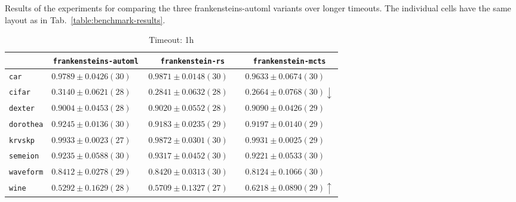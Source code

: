 \begin{table}[ht]
    \caption[Results of the experiments for comparing the three frankensteins-automl variants over longer timeouts.]{
        Results of the experiments for comparing the three frankensteins-automl variants over longer timeouts.
        The individual cells have the same layout as in Tab.~\ref{table:benchmark-results}.
    }
    \label{table:influence-results}
    \renewcommand{\arraystretch}{1.25}
    \begin{subtable}{\textwidth}
        \centering
        \caption{Timeout: 1h}
        \begin{tabular}{l|ccc}
            & \texttt{frankensteins-automl}  & \texttt{frankenstein-rs}  & \texttt{frankenstein-mcts} \\
            \hline
            \texttt{car} & $ 0.9789 \pm 0.0426 (30) \phantom{\downarrow}$ & $ \boldsymbol{0.9871} \pm 0.0148 (30) \phantom{\downarrow}$ & $ 0.9633 \pm 0.0674 (30) \phantom{\downarrow}$\\
            \texttt{cifar} & $ \boldsymbol{0.3140} \pm 0.0621 (28) \phantom{\downarrow}$ & $ 0.2841 \pm 0.0632 (28) \phantom{\downarrow}$ & $ 0.2664 \pm 0.0768 (30) \downarrow$\\
            \texttt{dexter} & $ 0.9004 \pm 0.0453 (28) \phantom{\downarrow}$ & $ 0.9020 \pm 0.0552 (28) \phantom{\downarrow}$ & $ \boldsymbol{0.9090} \pm 0.0426 (29) \phantom{\downarrow}$\\
            \texttt{dorothea} & $ \boldsymbol{0.9245} \pm 0.0136 (30) \phantom{\downarrow}$ & $ 0.9183 \pm 0.0235 (29) \phantom{\downarrow}$ & $ 0.9197 \pm 0.0140 (29) \phantom{\downarrow}$\\
            \texttt{krvskp} & $ \boldsymbol{0.9933} \pm 0.0023 (27) \phantom{\downarrow}$ & $ 0.9872 \pm 0.0301 (30) \phantom{\downarrow}$ & $ 0.9931 \pm 0.0025 (29) \phantom{\downarrow}$\\
            \texttt{semeion} & $ 0.9235 \pm 0.0588 (30) \phantom{\downarrow}$ & $ \boldsymbol{0.9317} \pm 0.0452 (30) \phantom{\downarrow}$ & $ 0.9221 \pm 0.0533 (30) \phantom{\downarrow}$\\
            \texttt{waveform} & $ 0.8412 \pm 0.0278 (29) \phantom{\downarrow}$ & $ \boldsymbol{0.8420} \pm 0.0313 (30) \phantom{\downarrow}$ & $ 0.8124 \pm 0.1066 (30) \phantom{\downarrow}$\\
            \texttt{wine} & $ 0.5292 \pm 0.1629 (28) \phantom{\downarrow}$ & $ 0.5709 \pm 0.1327 (27) \phantom{\downarrow}$ & $ \boldsymbol{0.6218} \pm 0.0890 (29) \uparrow$\\

\end{tabular}
\end{subtable}
\end{table}
